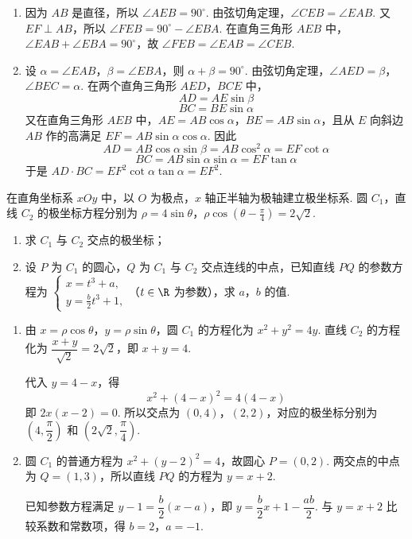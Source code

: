 \begin{solution}
\begin{enumerate}
\item 因为 \(AB\) 是直径，所以 \(\angle AEB=90^\circ\). 由弦切角定理，\(\angle CEB=\angle EAB\). 又 \(EF\perp AB\)，所以 \(\angle FEB=90^\circ-\angle EBA\). 在直角三角形 \(AEB\) 中，\(\angle EAB+\angle EBA=90^\circ\)，故 \(\angle FEB=\angle EAB=\angle CEB\).

\item 设 \(\alpha=\angle EAB\)，\(\beta=\angle EBA\)，则 \(\alpha+\beta=90^\circ\). 由弦切角定理，\(\angle AED=\beta\)，\(\angle BEC=\alpha\). 在两个直角三角形 \(AED\)，\(BCE\) 中，
\[
AD=AE\sin\beta
\]
\[
BC=BE\sin\alpha
\]
又在直角三角形 \(AEB\) 中，\(AE=AB\cos\alpha\)，\(BE=AB\sin\alpha\)，且从 \(E\) 向斜边 \(AB\) 作的高满足 \(EF=AB\sin\alpha\cos\alpha\). 因此
\[
AD=AB\cos\alpha\sin\beta=AB\cos^2\alpha=EF\cot\alpha
\]
\[
BC=AB\sin\alpha\sin\alpha=EF\tan\alpha
\]
于是 \(AD\cdot BC=EF^2\cot\alpha\tan\alpha=EF^2\).
\end{enumerate}
\end{solution}

\begin{problem}
在直角坐标系 \(xOy\) 中，以 \(O\) 为极点，\(x\) 轴正半轴为极轴建立极坐标系. 圆 \(C_1\)，直线 \(C_2\) 的极坐标方程分别为 \(\rho = 4\sin \theta\)，\(\rho \cos \left(\theta - \frac{\pi}{4}\right) = 2\sqrt{2}\).

\begin{enumerate}
\item 求 \(C_1\) 与 \(C_2\) 交点的极坐标；
\item 设 \(P\) 为 \(C_1\) 的圆心，\(Q\) 为 \(C_1\) 与 \(C_2\) 交点连线的中点，已知直线 \(PQ\) 的参数方程为 \(\begin{cases}
x = t^3 + a,\\
y = \frac{b}{2}t^3 + 1,
\end{cases}\)（\(t \in \R\) 为参数），求 \(a\)，\(b\) 的值.
\end{enumerate}
\end{problem}

\begin{solution}
\begin{enumerate}
\item 由 \(x=\rho\cos\theta\)，\(y=\rho\sin\theta\)，圆 \(C_1\) 的方程化为 \(x^2+y^2=4y\). 直线 \(C_2\) 的方程化为
\(\dfrac{x+y}{\sqrt2}=2\sqrt2\)，即 \(x+y=4\).

代入 \(y=4-x\)，得
\[
x^2+(4-x)^2=4(4-x)
\]
即 \(2x(x-2)=0\). 所以交点为 \((0,4)\)，\((2,2)\)，对应的极坐标分别为 \(\left(4,\dfrac\pi2\right)\) 和 \(\left(2\sqrt2,\dfrac\pi4\right)\).

\item 圆 \(C_1\) 的普通方程为 \(x^2+(y-2)^2=4\)，故圆心 \(P=(0,2)\). 两交点的中点为 \(Q=(1,3)\)，所以直线 \(PQ\) 的方程为 \(y=x+2\).

已知参数方程满足 \(y-1=\dfrac b2(x-a)\)，即 \(y=\dfrac b2x+1-\dfrac{ab}{2}\). 与 \(y=x+2\) 比较系数和常数项，得 \(b=2\)，\(a=-1\).
\end{enumerate}
\end{solution}

